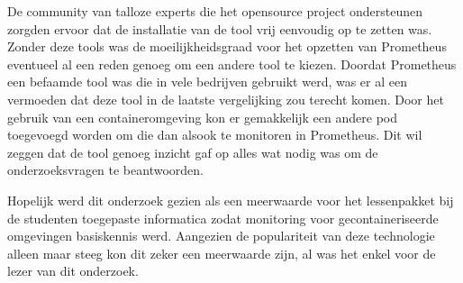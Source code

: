 De community van talloze experts die het opensource project ondersteunen zorgden ervoor dat de installatie van de tool vrij eenvoudig op te zetten was. Zonder deze tools was de moeilijkheidsgraad voor het opzetten van Prometheus eventueel al een reden genoeg om een andere tool te kiezen. Doordat Prometheus een befaamde tool was die in vele bedrijven gebruikt werd, was er al een vermoeden dat deze tool in de laatste vergelijking zou terecht komen. Door het gebruik van een containeromgeving kon er gemakkelijk een andere pod toegevoegd worden om die dan alsook te monitoren in Prometheus. Dit wil zeggen dat de tool genoeg inzicht gaf op alles wat nodig was om de onderzoeksvragen te beantwoorden.

Hopelijk werd dit onderzoek gezien als een meerwaarde voor het lessenpakket bij de studenten toegepaste informatica zodat monitoring voor gecontaineriseerde omgevingen basiskennis werd. Aangezien de populariteit van deze technologie alleen maar steeg kon dit zeker een meerwaarde zijn, al was het enkel voor de lezer van dit onderzoek.